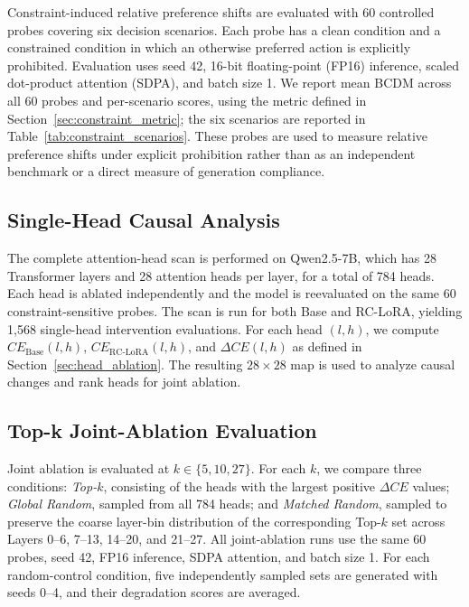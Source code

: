 Constraint-induced relative preference shifts are evaluated with 60 controlled probes covering six decision scenarios. Each probe has a clean condition and a constrained condition in which an otherwise preferred action is explicitly prohibited. Evaluation uses seed 42, 16-bit floating-point (FP16) inference, scaled dot-product attention (SDPA), and batch size 1. We report mean BCDM across all 60 probes and per-scenario scores, using the metric defined in Section~\ref{sec:constraint_metric}; the six scenarios are reported in Table~\ref{tab:constraint_scenarios}. These probes are used to measure relative preference shifts under explicit prohibition rather than as an independent benchmark or a direct measure of generation compliance.

\subsection{Single-Head Causal Analysis}
\label{sec:causal_setup}

The complete attention-head scan is performed on Qwen2.5-7B, which has 28 Transformer layers and 28 attention heads per layer, for a total of 784 heads. Each head is ablated independently and the model is reevaluated on the same 60 constraint-sensitive probes. The scan is run for both Base and RC-LoRA, yielding 1,568 single-head intervention evaluations. For each head $(l,h)$, we compute $CE_{\mathrm{Base}}(l,h)$, $CE_{\mathrm{RC\text{-}LoRA}}(l,h)$, and $\Delta CE(l,h)$ as defined in Section~\ref{sec:head_ablation}. The resulting $28\times28$ map is used to analyze causal changes and rank heads for joint ablation.

\subsection{Top-k Joint-Ablation Evaluation}
\label{sec:topk_setup}

Joint ablation is evaluated at $k\in\{5,10,27\}$. For each $k$, we compare three conditions: \emph{Top-$k$}, consisting of the heads with the largest positive $\Delta CE$ values; \emph{Global Random}, sampled from all 784 heads; and \emph{Matched Random}, sampled to preserve the coarse layer-bin distribution of the corresponding Top-$k$ set across Layers 0--6, 7--13, 14--20, and 21--27. All joint-ablation runs use the same 60 probes, seed 42, FP16 inference, SDPA attention, and batch size 1. For each random-control condition, five independently sampled sets are generated with seeds 0--4, and their degradation scores are averaged.

